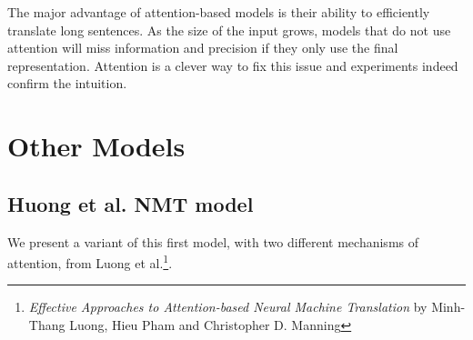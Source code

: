 \documentclass{tufte-handout}
\begin{document}
The major advantage of attention-based models is their ability to efficiently translate long sentences. As the size of the input grows, models that do not use attention will miss information and precision if they only use the final representation. Attention is a clever way to fix this issue and experiments indeed confirm the intuition.


\section{Other Models}

\subsection{Huong et al. NMT model}

We present a variant of this first model, with two different mechanisms of attention, from Luong et al.\footnote{\textit{Effective Approaches to Attention-based Neural Machine Translation} by Minh-Thang Luong,  Hieu Pham and Christopher D. Manning}. 
\end{document}
